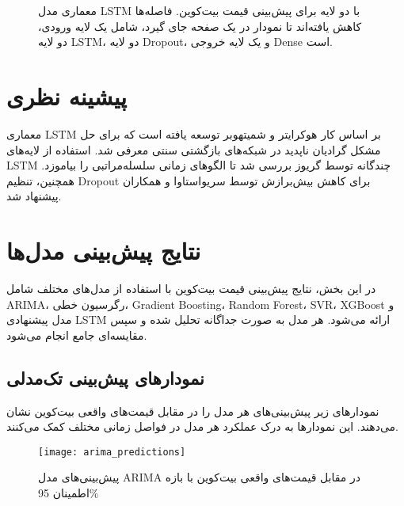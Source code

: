 \begin{figure}[H]
	\caption{معماری مدل LSTM با دو لایه برای پیش‌بینی قیمت بیت‌کوین. فاصله‌ها کاهش یافته‌اند تا نمودار در یک صفحه جای گیرد، شامل یک لایه ورودی، دو لایه LSTM، دو لایه Dropout، و یک لایه خروجی Dense است.}
	\label{fig:lstm_architecture}
\end{figure}





\section{پیشینه نظری}

معماری LSTM بر اساس کار هوکرایتر و شمیتهوبر \cite{Hochreiter1997} توسعه یافته است که برای حل مشکل گرادیان ناپدید در شبکه‌های بازگشتی سنتی معرفی شد. استفاده از لایه‌های LSTM چندگانه توسط گریوز \cite{Graves2013} بررسی شد تا الگوهای زمانی سلسله‌مراتبی را بیاموزد. همچنین، تنظیم Dropout برای کاهش بیش‌برازش توسط سریواستاوا و همکاران \cite{Srivastava2014} پیشنهاد شد.



\section{نتایج پیش‌بینی مدل‌ها}
در این بخش، نتایج پیش‌بینی قیمت بیت‌کوین با استفاده از مدل‌های مختلف شامل ARIMA، رگرسیون خطی، Gradient Boosting، Random Forest، SVR، XGBoost و مدل پیشنهادی LSTM ارائه می‌شود. هر مدل به صورت جداگانه تحلیل شده و سپس مقایسه‌ای جامع انجام می‌شود.

\subsection{نمودارهای پیش‌بینی تک‌مدلی}
نمودارهای زیر پیش‌بینی‌های هر مدل را در مقابل قیمت‌های واقعی بیت‌کوین نشان می‌دهند. این نمودارها به درک عملکرد هر مدل در فواصل زمانی مختلف کمک می‌کنند.

\begin{figure}[H]
	\centering
	\texttt{[image: arima\_predictions]}
	\caption{پیش‌بینی‌های مدل ARIMA در مقابل قیمت‌های واقعی بیت‌کوین با بازه اطمینان 95\%}
	\label{fig:arima_predictions}
\end{figure}

